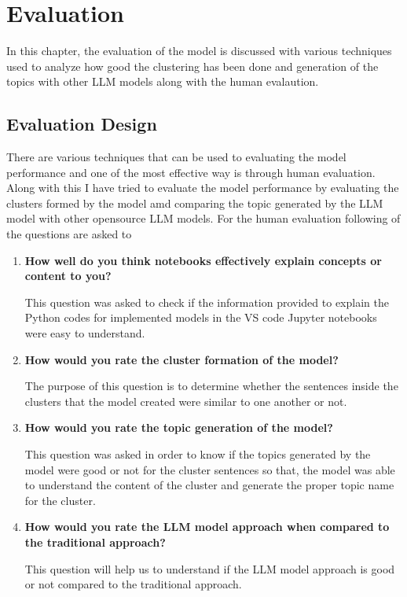 \chapter{Evaluation}

\label{Chapter5}


In this chapter, the evaluation of the model is discussed with various techniques used to analyze how good the clustering has been done
and generation of the topics with other LLM models along with the human evalaution.

\section{Evaluation Design}
There are various techniques that can be used to evaluating the model performance and one of the most effective way is through human evaluation.
Along with this I have tried to evaluate the model performance by evaluating the clusters formed by the model amd comparing the topic generated
by the LLM model with other opensource LLM models. For the human evaluation following of the questions are asked to 

\begin{enumerate}
    \item\textbf{How well do you think notebooks effectively explain concepts or content to you?}
    
    This question was asked to check if the information provided to explain the Python codes for implemented models in the VS code Jupyter notebooks were easy to understand.

    \item\textbf{How would you rate the cluster formation of the model?}
    
    The purpose of this question is to determine whether the sentences inside the clusters that the model created were similar to one another or not.

    \item\textbf{How would you rate the topic generation of the model?}
    
    This question was asked in order to know if the topics generated by the model were good or not for the cluster sentences so that, the model was able to understand the content of the cluster
    and generate the proper topic name for the cluster.

    \item\textbf{How would you rate the LLM model approach when compared to the traditional approach?}
    
    This question will help us to understand if the LLM model approach is good or not compared to the traditional approach.
\end{enumerate}

